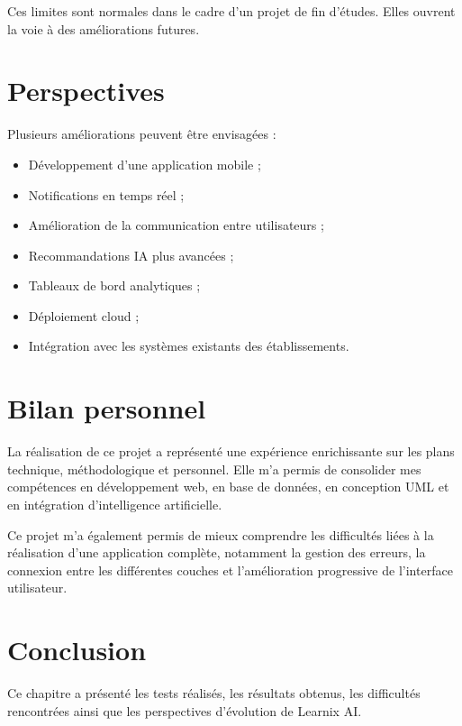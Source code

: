 \documentclass[12pt,a4paper]{report}
\begin{document}
Ces limites sont normales dans le cadre d'un projet de fin d'études. Elles
ouvrent la voie à des améliorations futures.

\section{Perspectives}

Plusieurs améliorations peuvent être envisagées :

\begin{itemize}
    \item Développement d'une application mobile ;
    \item Notifications en temps réel ;
    \item Amélioration de la communication entre utilisateurs ;
    \item Recommandations IA plus avancées ;
    \item Tableaux de bord analytiques ;
    \item Déploiement cloud ;
    \item Intégration avec les systèmes existants des établissements.
\end{itemize}

\section{Bilan personnel}

La réalisation de ce projet a représenté une expérience enrichissante sur les
plans technique, méthodologique et personnel. Elle m'a permis de consolider mes
compétences en développement web, en base de données, en conception UML et en
intégration d'intelligence artificielle.

Ce projet m'a également permis de mieux comprendre les difficultés liées à la
réalisation d'une application complète, notamment la gestion des erreurs, la
connexion entre les différentes couches et l'amélioration progressive de
l'interface utilisateur.

\section{Conclusion}

Ce chapitre a présenté les tests réalisés, les résultats obtenus, les difficultés rencontrées ainsi que les perspectives d'évolution de Learnix AI.

\end{document}
